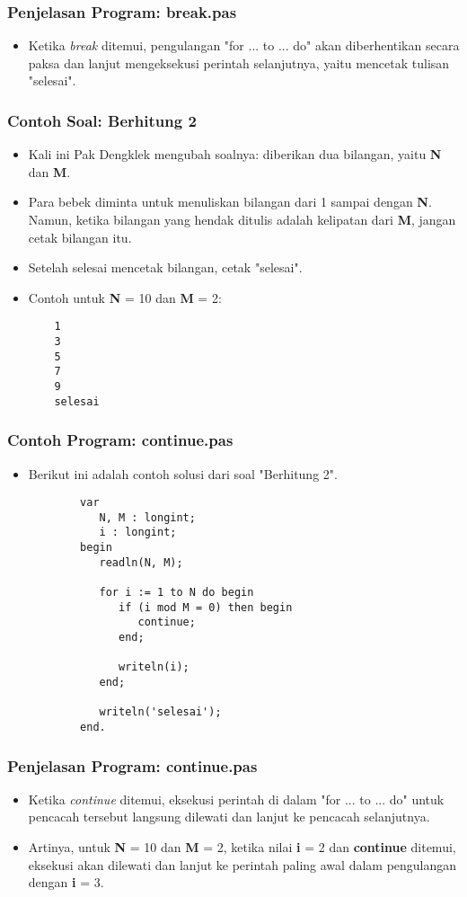\documentclass{beamer}
\begin{document}
\begin{frame}
\frametitle{Penjelasan Program: break.pas}
\begin{itemize}
	\item Ketika \textit{break} ditemui, pengulangan "for ... to ... do" akan diberhentikan secara paksa dan lanjut mengeksekusi perintah selanjutnya, yaitu mencetak tulisan "selesai".
\end{itemize}
\end{frame}

\begin{frame}[fragile]
\frametitle{Contoh Soal: Berhitung 2}
\begin{itemize}
	\item Kali ini Pak Dengklek mengubah soalnya: diberikan dua bilangan, yaitu \textbf{N} dan \textbf{M}.
	\item Para bebek diminta untuk menuliskan bilangan dari 1 sampai dengan \textbf{N}. Namun, ketika bilangan yang hendak ditulis adalah \alert{kelipatan} dari \textbf{M}, jangan cetak bilangan itu.
	\item Setelah selesai mencetak bilangan, cetak "selesai".
	\item Contoh untuk \textbf{N} = 10 dan \textbf{M} = 2:
	\begin{lstlisting}
	1
	3
	5
	7
	9
	selesai
	\end{lstlisting}
\end{itemize}
\end{frame}

\begin{frame}[fragile]
\frametitle{Contoh Program: continue.pas}
\begin{itemize}
	\item Berikut ini adalah contoh solusi dari soal "Berhitung 2".
	\begin{lstlisting}
		var
		   N, M : longint;
		   i : longint;
		begin
		   readln(N, M);
		
		   for i := 1 to N do begin
		      if (i mod M = 0) then begin
		         continue;
		      end;
		
		      writeln(i);
		   end;
		   
		   writeln('selesai');
		end.
	\end{lstlisting}
\end{itemize}
\end{frame}

\begin{frame}
\frametitle{Penjelasan Program: continue.pas}
\begin{itemize}
	\item Ketika \textit{continue} ditemui, eksekusi perintah di dalam "for ... to ... do" untuk pencacah tersebut langsung dilewati dan lanjut ke pencacah selanjutnya.
	\item Artinya, untuk \textbf{N} = 10 dan \textbf{M} = 2, ketika nilai \textbf{i} = 2 dan \textbf{continue} ditemui, eksekusi akan dilewati dan lanjut ke perintah paling awal dalam pengulangan dengan \textbf{i} = 3. 
\end{itemize}
\end{frame}
\end{document}
